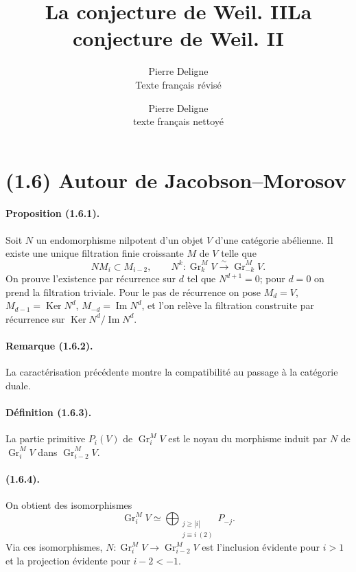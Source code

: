 \documentclass[11pt]{article}
\title{La conjecture de Weil. II}
\author{Pierre Deligne\\\small Texte français révisé}
\date{}
\theoremstyle{remark}
\newcommand{\Gr}{\operatorname{Gr}}
\newcommand{\Ker}{\operatorname{Ker}}
\begin{document}
\title{La conjecture de Weil. II}
\author{Pierre Deligne\\\small texte français nettoyé}
\date{}\maketitle


\section*{(1.6) Autour de Jacobson--Morosov}

\paragraph{Proposition (1.6.1).} Soit $N$ un endomorphisme nilpotent d'un objet $V$ d'une catégorie abélienne. Il existe une unique filtration finie croissante $M$ de $V$ telle que
\[
        NM_i\subset M_{i-2},
        \qquad
        N^k:\Gr^M_kV\xrightarrow{\sim}\Gr^M_{-k}V.
\]
On prouve l'existence par récurrence sur $d$ tel que $N^{d+1}=0$; pour $d=0$ on prend la filtration triviale. Pour le pas de récurrence on pose $M_d=V$, $M_{d-1}=\Ker N^d$, $M_{-d}=\operatorname{Im}N^d$, et l'on relève la filtration construite par récurrence sur $\Ker N^d/\operatorname{Im}N^d$.

\paragraph{Remarque (1.6.2).} La caractérisation précédente montre la compatibilité au passage à la catégorie duale.

\paragraph{Définition (1.6.3).} La partie primitive $P_i(V)$ de $\Gr^M_iV$ est le noyau du morphisme induit par $N$ de $\Gr^M_iV$ dans $\Gr^M_{i-2}V$.

\paragraph{(1.6.4).} On obtient des isomorphismes
\begin{equation}\tag{1.6.4.1}
        \Gr^M_iV\simeq \bigoplus_{\substack{j\ge |i|\\ j\equiv i\ (2)}} P_{-j}.
\end{equation}
Via ces isomorphismes, $N:\Gr^M_iV\to\Gr^M_{i-2}V$ est l'inclusion évidente pour $i>1$ et la projection évidente pour $i-2<-1$.
\end{document}
